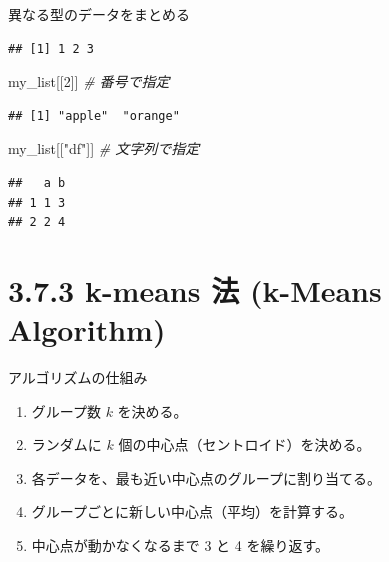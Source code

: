 \documentclass[
  ignorenonframetext,
]{beamer}
\newenvironment{Shaded}{\begin{snugshade}}{\end{snugshade}}
\newcommand{\CommentTok}[1]{\textcolor[rgb]{0.56,0.35,0.01}{\textit{#1}}}
\newcommand{\DecValTok}[1]{\textcolor[rgb]{0.00,0.00,0.81}{#1}}
\newcommand{\NormalTok}[1]{#1}
\newcommand{\SpecialCharTok}[1]{\textcolor[rgb]{0.00,0.00,0.00}{#1}}
\newcommand{\StringTok}[1]{\textcolor[rgb]{0.31,0.60,0.02}{#1}}
\providecommand{\tightlist}{%
  \setlength{\itemsep}{0pt}\setlength{\parskip}{0pt}}
\begin{document}
\begin{frame}[fragile]{異なる型のデータをまとめる}
\protect\hypertarget{ux7570ux306aux308bux578bux306eux30c7ux30fcux30bfux3092ux307eux3068ux3081ux308b-1}{}
\scriptsize

\begin{Shaded}
\end{Shaded}

\begin{verbatim}
## [1] 1 2 3
\end{verbatim}

\begin{Shaded}
\begin{Highlighting}[]
\NormalTok{my\_list[[}\DecValTok{2}\NormalTok{]]    }\CommentTok{\# 番号で指定}
\end{Highlighting}
\end{Shaded}

\begin{verbatim}
## [1] "apple"  "orange"
\end{verbatim}

\begin{Shaded}
\begin{Highlighting}[]
\NormalTok{my\_list[[}\StringTok{"df"}\NormalTok{]] }\CommentTok{\# 文字列で指定}
\end{Highlighting}
\end{Shaded}

\begin{verbatim}
##   a b
## 1 1 3
## 2 2 4
\end{verbatim}

\normalsize
\end{frame}

\hypertarget{k-means-ux6cd5-k-means-algorithm}{%
\section{3.7.3 k-means 法 (k-Means
Algorithm)}\label{k-means-ux6cd5-k-means-algorithm}}

\begin{frame}{アルゴリズムの仕組み}
\protect\hypertarget{ux30a2ux30ebux30b4ux30eaux30baux30e0ux306eux4ed5ux7d44ux307f}{}
\begin{enumerate}
\tightlist
\item
  グループ数 \(k\) を決める。
\item
  ランダムに \(k\) 個の中心点（セントロイド）を決める。
\item
  各データを、最も近い中心点のグループに割り当てる。
\item
  グループごとに新しい中心点（平均）を計算する。
\item
  中心点が動かなくなるまで 3 と 4 を繰り返す。
\end{enumerate}
\end{frame}
\end{document}
